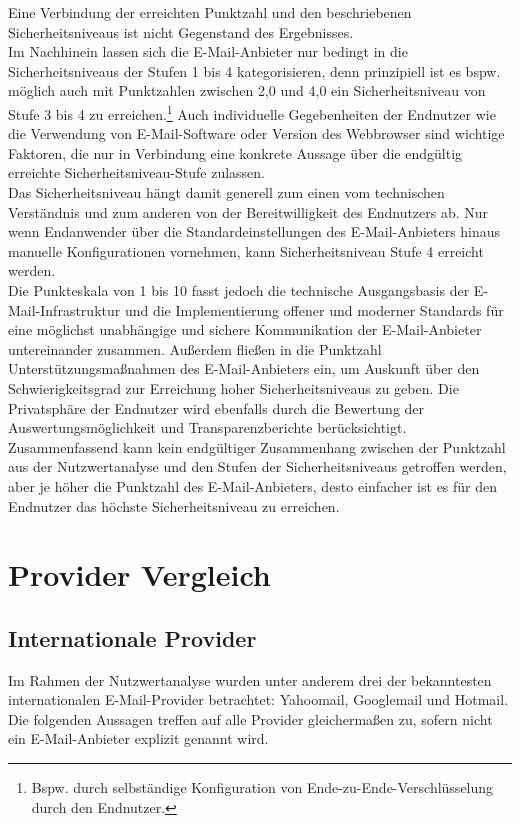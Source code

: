 \documentclass  [paper=a4,
				fontsize=12pt,
				listof=totoc,
				bibliography=totoc
				]{scrreprt}
\begin{document}
			Eine Verbindung der erreichten Punktzahl und den beschriebenen Sicherheitsniveaus ist nicht Gegenstand des Ergebnisses.\medskip\\
			Im Nachhinein lassen sich die E-Mail-Anbieter nur bedingt in die Sicherheitsniveaus der Stufen 1 bis 4 kategorisieren, denn prinzipiell ist es bspw. möglich auch mit Punktzahlen zwischen 2,0 und 4,0 ein Sicherheitsniveau von Stufe 3 bis 4 zu erreichen.\footnote{Bspw. durch selbständige Konfiguration von Ende-zu-Ende-Verschlüsselung durch den Endnutzer.}
			Auch individuelle Gegebenheiten der Endnutzer wie die Verwendung von E-Mail-Software oder Version des Webbrowser sind wichtige Faktoren, die nur in Verbindung eine konkrete Aussage über die endgültig erreichte Sicherheitsniveau-Stufe zulassen.\medskip\\
			Das Sicherheitsniveau hängt damit generell zum einen vom technischen Verständnis und zum anderen von der Bereitwilligkeit des Endnutzers ab. %
			Nur wenn Endanwender über die Standardeinstellungen des E-Mail-Anbieters hinaus manuelle Konfigurationen vornehmen, kann Sicherheitsniveau Stufe 4 erreicht werden.\medskip\\
			Die Punkteskala von 1 bis 10 fasst jedoch die technische Ausgangsbasis der E-Mail-Infrastruktur und die Implementierung offener und moderner Standards für eine möglichst unabhängige und sichere Kommunikation der E-Mail-Anbieter untereinander zusammen.
			Außerdem fließen in die Punktzahl Unterstützungsmaßnahmen des E-Mail-Anbieters ein, um Auskunft über den Schwierigkeitsgrad zur Erreichung hoher Sicherheitsniveaus zu geben.
			Die Privatsphäre der Endnutzer wird ebenfalls durch die Bewertung der Auswertungsmöglichkeit und Transparenzberichte berücksichtigt.\medskip\\
			Zusammenfassend kann kein endgültiger Zusammenhang zwischen der Punktzahl aus der Nutzwertanalyse und den Stufen der Sicherheitsniveaus getroffen werden, aber je höher die Punktzahl des E-Mail-Anbieters, desto einfacher ist es für den Endnutzer das höchste Sicherheitsniveau zu erreichen.
			
			
		
		\section{Provider Vergleich}\label{sec:provider-vergleich}
			\subsection{Internationale Provider}
			Im Rahmen der Nutzwertanalyse wurden unter anderem drei der bekanntesten internationalen E-Mail-Provider betrachtet: Yahoomail, Googlemail und Hotmail. Die folgenden Aussagen treffen auf alle Provider gleichermaßen zu, sofern nicht ein E-Mail-Anbieter explizit genannt wird.
\end{document}

